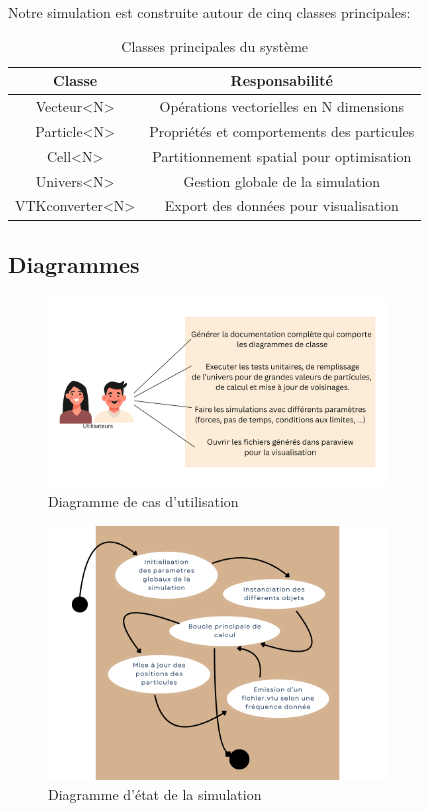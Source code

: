 \documentclass[12pt,a4paper]{article}
\begin{document}
Notre simulation est construite autour de cinq classes principales:

\begin{table}[H]
\centering
\begin{tabular}{|c|c|}
\hline
\textbf{Classe} & \textbf{Responsabilité} \\
\hline
Vecteur<N> & Opérations vectorielles en N dimensions \\
\hline
Particle<N> & Propriétés et comportements des particules \\
\hline
Cell<N> & Partitionnement spatial pour optimisation \\
\hline
Univers<N> & Gestion globale de la simulation \\
\hline
VTKconverter<N> & Export des données pour visualisation \\
\hline
\end{tabular}
\caption{Classes principales du système}
\end{table}

\subsection{Diagrammes}

\begin{figure}[H]
\centering
\includegraphics[width=0.8\textwidth]{assets/diagrammeCasUtilisation.png}
\caption{Diagramme de cas d'utilisation}
\end{figure}

\begin{figure}[H]
\centering
\includegraphics[width=0.8\textwidth]{assets/diagrammeEtatTransition.png}
\caption{Diagramme d'état de la simulation}
\end{figure}
\end{document}
